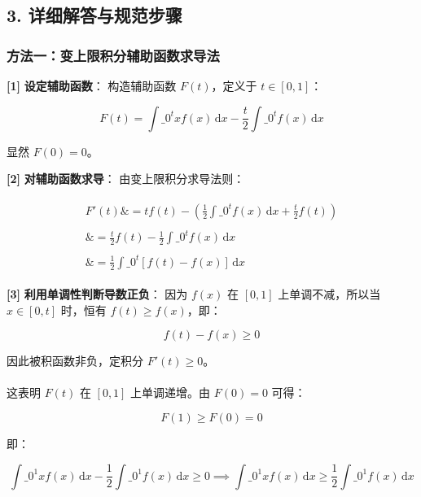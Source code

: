 \documentclass[11pt,a4paper,UTF8]{ctexart}
\begin{document}
\subsection{3. 详细解答与规范步骤}


\subsubsection{方法一：变上限积分辅助函数求导法}
\begin{solbox}[分步推导与答题规范]
\textbf{[1]}  \textbf{设定辅助函数}：
构造辅助函数 $F(t)$，定义于 $t \in [0, 1]$：

\begin{equation*}
F(t) = \int\_0^t x f(x)\,\mathrm{d}x - \frac{t}{2}\int\_0^t f(x)\,\mathrm{d}x
\end{equation*}

显然 $F(0) = 0$。

\textbf{[2]}  \textbf{对辅助函数求导}：
由变上限积分求导法则：

\begin{align*}
\begin{aligned}
F'(t) \&= t f(t) - \left( \frac{1}{2}\int\_0^t f(x)\,\mathrm{d}x + \frac{t}{2}f(t) \right) \\ \\
\&= \frac{t}{2}f(t) - \frac{1}{2}\int\_0^t f(x)\,\mathrm{d}x \\ \\
\&= \frac{1}{2}\int\_0^t [f(t) - f(x)]\,\mathrm{d}x
\end{aligned}
\end{align*}


\textbf{[3]}  \textbf{利用单调性判断导数正负}：
因为 $f(x)$ 在 $[0, 1]$ 上单调不减，所以当 $x \in [0, t]$ 时，恒有 $f(t) \ge f(x)$，即：

\begin{equation*}
f(t) - f(x) \ge 0
\end{equation*}

因此被积函数非负，定积分 $F'(t) \ge 0$。\\ \\
这表明 $F(t)$ 在 $[0, 1]$ 上单调递增。由 $F(0) = 0$ 可得：

\begin{equation*}
F(1) \ge F(0) = 0
\end{equation*}

即：

\begin{equation*}
\int\_0^1 x f(x)\,\mathrm{d}x - \frac{1}{2}\int\_0^1 f(x)\,\mathrm{d}x \ge 0 \implies \int\_0^1 x f(x)\,\mathrm{d}x \ge \frac{1}{2}\int\_0^1 f(x)\,\mathrm{d}x
\end{equation*}

\end{solbox}
\end{document}
